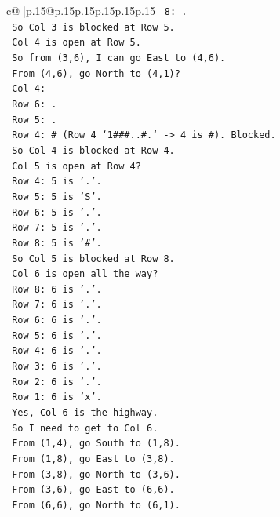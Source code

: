 \documentclass{article}
\begin{document}
{\begin{supertabular}{c@{$\;$}|p{.15\linewidth}@{}p{.15\linewidth}p{.15\linewidth}p{.15\linewidth}p{.15\linewidth}p{.15\linewidth}}
{{{\texttt{     8: .} \\
\texttt{     So Col 3 is blocked at Row 5.} \\
\texttt{     Col 4 is open at Row 5.} \\
\texttt{     So from (3,6), I can go East to (4,6).} \\
\texttt{     From (4,6), go North to (4,1)?} \\
\texttt{     Col 4:} \\
\texttt{     Row 6: .} \\
\texttt{     Row 5: .} \\
\texttt{     Row 4: \# (Row 4 `1\#\#\#..\#.` {-}> 4 is \#). Blocked.} \\
\texttt{     So Col 4 is blocked at Row 4.} \\
\texttt{     Col 5 is open at Row 4?} \\
\texttt{     Row 4: 5 is '.'.} \\
\texttt{     Row 5: 5 is 'S'.} \\
\texttt{     Row 6: 5 is '.'.} \\
\texttt{     Row 7: 5 is '.'.} \\
\texttt{     Row 8: 5 is '\#'.} \\
\texttt{     So Col 5 is blocked at Row 8.} \\
\texttt{     Col 6 is open all the way?} \\
\texttt{     Row 8: 6 is '.'.} \\
\texttt{     Row 7: 6 is '.'.} \\
\texttt{     Row 6: 6 is '.'.} \\
\texttt{     Row 5: 6 is '.'.} \\
\texttt{     Row 4: 6 is '.'.} \\
\texttt{     Row 3: 6 is '.'.} \\
\texttt{     Row 2: 6 is '.'.} \\
\texttt{     Row 1: 6 is 'x'.} \\
\texttt{     Yes, Col 6 is the highway.} \\
\texttt{     So I need to get to Col 6.} \\
\texttt{     From (1,4), go South to (1,8).} \\
\texttt{     From (1,8), go East to (3,8).} \\
\texttt{     From (3,8), go North to (3,6).} \\
\texttt{     From (3,6), go East to (6,6).} \\
\texttt{     From (6,6), go North to (6,1).} \\
}}}
\end{supertabular}}
\end{document}
